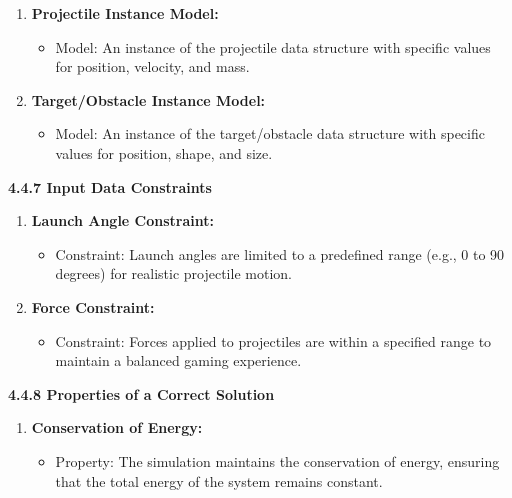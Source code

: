 \documentclass[
]{article}
\begin{document}
\begin{enumerate}
\def\labelenumi{\arabic{enumi}.}
\item
  \textbf{Projectile Instance Model:}

  \begin{itemize}
  \item
    Model: An instance of the projectile data structure with specific
    values for position, velocity, and mass.
  \end{itemize}
\item
  \textbf{Target/Obstacle Instance Model:}

  \begin{itemize}
  \item
    Model: An instance of the target/obstacle data structure with
    specific values for position, shape, and size.
  \end{itemize}
\end{enumerate}

\protect\hypertarget{qrrrrrrrrrrrrrrrrrr}{}{}\textbf{4.4.7 Input Data
Constraints}

\begin{enumerate}
\def\labelenumi{\arabic{enumi}.}
\item
  \textbf{Launch Angle Constraint:}

  \begin{itemize}
  \item
    Constraint: Launch angles are limited to a predefined range (e.g., 0
    to 90 degrees) for realistic projectile motion.
  \end{itemize}
\item
  \textbf{Force Constraint:}

  \begin{itemize}
  \item
    Constraint: Forces applied to projectiles are within a specified
    range to maintain a balanced gaming experience.
  \end{itemize}
\end{enumerate}

\protect\hypertarget{qrrrrrrrrrrrrrrrrrrr}{}{}\textbf{4.4.8 Properties
of a Correct Solution}

\begin{enumerate}
\def\labelenumi{\arabic{enumi}.}
\item
  \textbf{Conservation of Energy:}

  \begin{itemize}
  \item
    Property: The simulation maintains the conservation of energy,
    ensuring that the total energy of the system remains constant.
  \end{itemize}
\end{enumerate}
\end{document}
